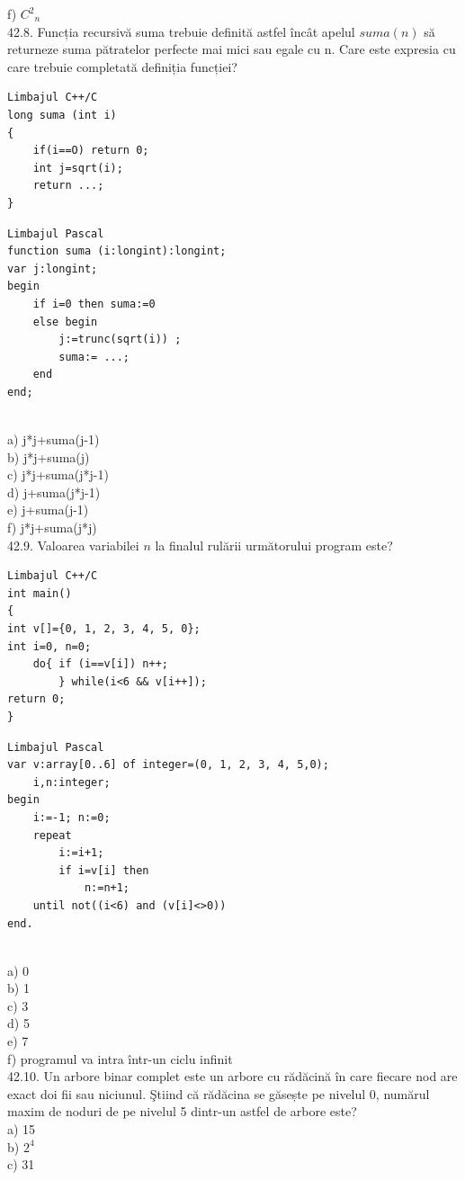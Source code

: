 \begin{itemize}
\begin{enumerate}
f) $C^{2}{ }_{n}$
\\
42.8. Funcția recursivă suma trebuie definită astfel încât apelul $suma(n)$ să returneze suma pătratelor perfecte mai mici sau egale cu n. Care este expresia cu care trebuie completată definiția funcției?
\begin{verbatim}
Limbajul C++/C
long suma (int i)
{
    if(i==O) return 0;
    int j=sqrt(i);
    return ...;
}
\end{verbatim}
\begin{verbatim}
Limbajul Pascal
function suma (i:longint):longint;
var j:longint;
begin
    if i=0 then suma:=0
    else begin
        j:=trunc(sqrt(i)) ;
        suma:= ...;
    end
end;
\end{verbatim}
\\
a) j*j+suma(j-1)
\\
b) j*j+suma(j)
\\
c) j*j+suma(j*j-1)
\\
d) j+suma(j*j-1)
\\
e) j+suma(j-1)
\\
f) j*j+suma(j*j)
\\
42.9. Valoarea variabilei $n$ la finalul rulării următorului program este?
\begin{verbatim}
Limbajul C++/C
int main()
{
int v[]={0, 1, 2, 3, 4, 5, 0};
int i=0, n=0;
    do{ if (i==v[i]) n++;
        } while(i<6 && v[i++]);
return 0;
}
\end{verbatim}
\begin{verbatim}
Limbajul Pascal
var v:array[0..6] of integer=(0, 1, 2, 3, 4, 5,0);
    i,n:integer;
begin
    i:=-1; n:=0;
    repeat
        i:=i+1;
        if i=v[i] then
            n:=n+1;
    until not((i<6) and (v[i]<>0))
end.
\end{verbatim}
\\
a) 0
\\
b) 1
\\
c) 3
\\
d) 5
\\
e) 7
\\
f) programul va intra într-un ciclu infinit
\\
42.10. Un arbore binar complet este un arbore cu rădăcină în care fiecare nod are exact doi fii sau niciunul. Ştiind că rădăcina se găsește pe nivelul 0, numărul maxim de noduri de pe nivelul 5 dintr-un astfel de arbore este?
\\
a) 15
\\
b) $2^{4}$
\\
c) 31
\\

\end{enumerate}
\end{itemize}
